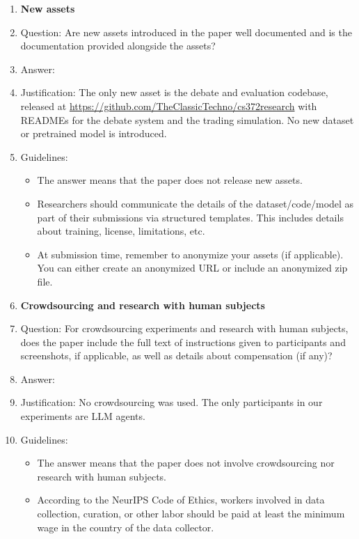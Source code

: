 \begin{enumerate}
\item {\bf New assets}
    \item[] Question: Are new assets introduced in the paper well documented and is the documentation provided alongside the assets?
    \item[] Answer: \answerYes{}
    \item[] Justification: The only new asset is the debate and evaluation codebase, released at \url{https://github.com/TheClassicTechno/cs372research} with READMEs for the debate system and the trading simulation. No new dataset or pretrained model is introduced.
    \item[] Guidelines:
    \begin{itemize}
        \item The answer \answerNA{} means that the paper does not release new assets.
        \item Researchers should communicate the details of the dataset/code/model as part of their submissions via structured templates. This includes details about training, license, limitations, etc.
        \item At submission time, remember to anonymize your assets (if applicable). You can either create an anonymized URL or include an anonymized zip file.
    \end{itemize}

\item {\bf Crowdsourcing and research with human subjects}
    \item[] Question: For crowdsourcing experiments and research with human subjects, does the paper include the full text of instructions given to participants and screenshots, if applicable, as well as details about compensation (if any)?
    \item[] Answer: \answerNA{}
    \item[] Justification: No crowdsourcing was used. The only participants in our experiments are LLM agents.
    \item[] Guidelines:
    \begin{itemize}
        \item The answer \answerNA{} means that the paper does not involve crowdsourcing nor research with human subjects.
        \item According to the NeurIPS Code of Ethics, workers involved in data collection, curation, or other labor should be paid at least the minimum wage in the country of the data collector.
    \end{itemize}


\end{enumerate}
